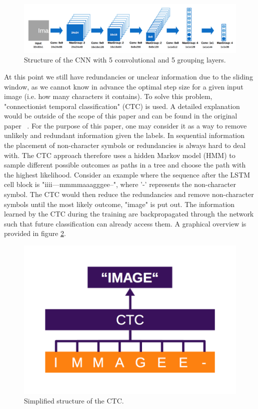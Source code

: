 \documentclass{utue} %
\begin{document}
\begin{figure}[h!]
	\centering
	\includegraphics[width=\textwidth]{graphics/model_cnn.png}
	\caption{\label{fig:cnn_structure} Structure of the CNN with 5 convolutional and 5 grouping layers.}
\end{figure}

At this point we still have redundancies or unclear information due to the sliding window, as we cannot know in advance the optimal step size for a given input image (i.e. how  many characters it contains). To solve this problem, "connectionist temporal classification" (CTC) is used. A detailed explanation would be outside of the scope of this paper and can be found in the original paper  ~\cite{Graves:2006:CTC:1143844.1143891}.
For the purpose of this paper, one may consider it as a way to remove unlikely and redundant information given the labels. In sequential information the placement of non-character symbols or redundancies is always hard to deal with. The CTC approach therefore uses a hidden Markov model (HMM) to sample different possible outcomes as paths in a tree and choose the path with the highest likelihood. Consider an example where the sequence after the LSTM cell block is "iiii---mmmmaaagggee--", where '-' represents the non-character symbol. The CTC would then reduce the redundancies and remove non-character symbols until the most likely outcome, "image" is put out. The information learned by the CTC during the training are backpropagated through the network such that future classification can already access them. A graphical overview is provided in figure \ref{fig:structure_ctc}. \\
\begin{figure}[h!]
	\centering
	\includegraphics[width=\columnwidth]{graphics/model_ctc.png}
	\caption{\label{fig:structure_ctc} Simplified structure of the CTC.}
\end{figure}
\end{document}
